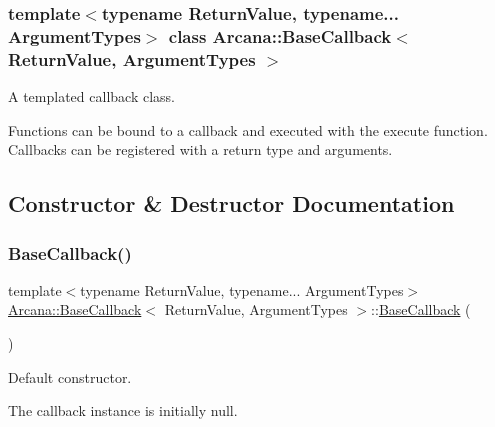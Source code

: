 \subsubsection*{template$<$typename Return\+Value, typename... Argument\+Types$>$\newline
class Arcana\+::\+Base\+Callback$<$ Return\+Value, Argument\+Types $>$}

A templated callback class. 

Functions can be bound to a callback and executed with the execute function. Callbacks can be registered with a return type and arguments. 

\subsection{Constructor \& Destructor Documentation}
\mbox{\label{class_arcana_1_1_base_callback_a79731f710c224094f56afe210315ec05}} 
\subsubsection{\texorpdfstring{Base\+Callback()}{BaseCallback()}\hspace{0.1cm}{\footnotesize\ttfamily [1/2]}}
{\footnotesize\ttfamily template$<$typename Return\+Value, typename... Argument\+Types$>$ \\
\mbox{\hyperlink{class_arcana_1_1_base_callback}{Arcana\+::\+Base\+Callback}}$<$ Return\+Value, Argument\+Types $>$\+::\mbox{\hyperlink{class_arcana_1_1_base_callback}{Base\+Callback}} (\begin{DoxyParamCaption}{ }\end{DoxyParamCaption})\hspace{0.3cm}{\ttfamily [inline]}}



Default constructor. 

The callback instance is initially null. \mbox{\label{class_arcana_1_1_base_callback_a0a3da87cf8bd61e627dd76a7b23ab897}} 
